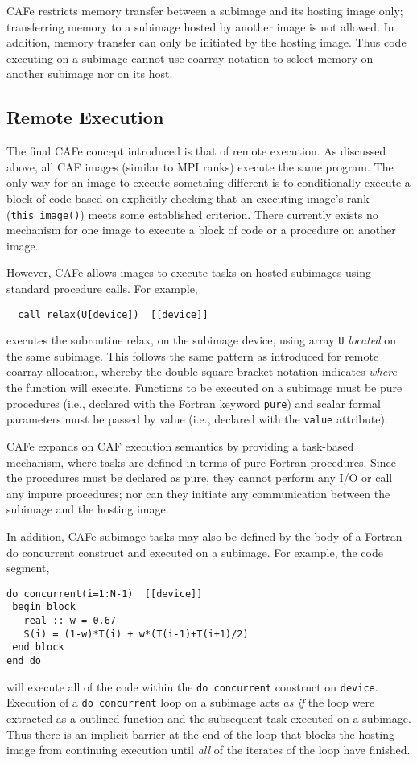 CAFe restricts memory transfer between a subimage and its hosting image only; transferring
memory to a subimage hosted by another image is not allowed.  In addition, memory transfer
can only be initiated by the hosting image.  Thus code executing on a subimage cannot use
coarray notation to select memory on another subimage nor on its host.

\subsection{Remote Execution}

The final CAFe concept introduced is that of remote execution.  As discussed above,
all CAF images (similar to MPI ranks) execute the same program.  The only way for
an image to execute something different is to conditionally execute a block of code based
on explicitly checking that an executing image's rank (\texttt{this\_image()}) meets some
established criterion.  There currently exists no mechanism for one image to execute a
block of code or a procedure on another image.

However, CAFe allows images to execute tasks on hosted subimages using standard procedure
calls.  For example,
\begin{verbatim}
  call relax(U[device])  [[device]]
\end{verbatim}
executes the subroutine relax, on the subimage device, using array \texttt{U} \emph{located}
on the same subimage.  This follows the same pattern as introduced for remote coarray allocation,
whereby the double square bracket notation indicates \emph{where} the function will execute.
Functions to be executed on a subimage must be pure procedures (i.e., declared with the Fortran
keyword \texttt{pure}) and scalar formal parameters must be passed by value (i.e., declared with the
\texttt{value} attribute).

CAFe expands on CAF execution semantics by providing a task-based mechanism, where tasks
are defined in terms of pure Fortran procedures.  Since the procedures must be declared
as pure, they cannot perform any I/O or call any impure procedures; nor can they initiate
any communication between the subimage and the hosting image.

In addition, CAFe subimage tasks may also be defined by the body of a Fortran do
concurrent construct and executed on a subimage.  For example, the code segment,
\begin{verbatim}
do concurrent(i=1:N-1)  [[device]]
 begin block
   real :: w = 0.67
   S(i) = (1-w)*T(i) + w*(T(i-1)+T(i+1)/2)
 end block
end do
\end{verbatim}
will execute all of the code within the \texttt{do concurrent} construct on \texttt{device}.
Execution of a \texttt{do concurrent} loop on a subimage acts \emph{as if} the loop were
extracted as a outlined function and the subsequent task executed on a subimage.  Thus
there is an implicit barrier at the end of the loop that blocks the hosting image
from continuing execution until \emph{all} of the iterates of the loop have finished.

